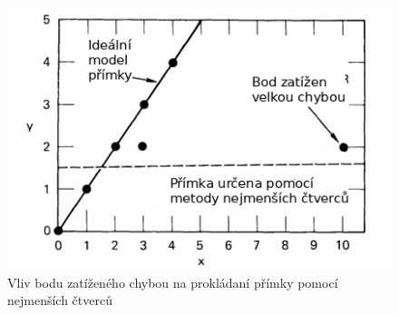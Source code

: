 \documentclass[twoside]{ctuthesis}
\newcommand{\spc}[2]{$\mathbb{#1}^{#2}$}
\newcommand{\minsp}[3]{$\mathbb{#1} \in \mathbb{#2}^{#3}$}
\newcommand{\tl}[1]{$\mathbf{#1}$}
\begin{document}
\begin{figure}
    \centering
    \includegraphics[width = 0.9 \linewidth]{pictures/ransac_least_squares.png}
    \caption{Vliv bodu zatíženého chybou na prokládaní přímky pomocí nejmenších čtverců \cite{fischler1981random}}
    \label{fig:least_squares_error}
\end{figure}


\end{document}
